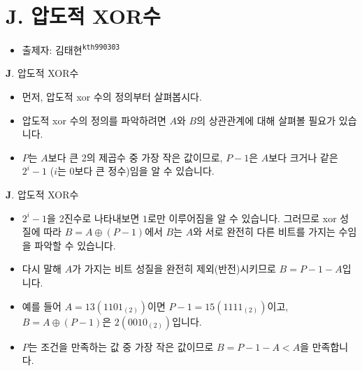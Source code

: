 \section{J. 압도적 XOR수}

\begin{frame} %
    \begin{itemize}
        \item 출제자: 김태현\textsuperscript{\color{kupc-gray}\texttt{kth990303}}
    \end{itemize}
\end{frame}

\begin{frame}{\textbf{J}. 압도적 XOR수}
    \begin{itemize}
        \item 먼저, 압도적 xor 수의 정의부터 살펴봅시다.
        \item 압도적 xor 수의 정의를 파악하려면 $A$와 $B$의 상관관계에 대해 살펴볼 필요가 있습니다.
        \item $P$는 $A$보다 큰 2의 제곱수 중 가장 작은 값이므로, $P-1$은 $A$보다 크거나 같은 $2^i-1$ ($i$는 0보다 큰 정수)임을 알 수 있습니다.
    \end{itemize}
\end{frame}

\begin{frame}{\textbf{J}. 압도적 XOR수}
	\begin{itemize}
		\item $2^i-1$을 2진수로 나타내보면 $1$로만 이루어짐을 알 수 있습니다. 그러므로 xor 성질에 따라 $B = A \oplus (P-1)$에서 $B$는 $A$와 서로 완전히 다른 비트를 가지는 수임을 파악할 수 있습니다. 
		\item 다시 말해 $A$가 가지는 비트 성질을 완전히 제외(반전)시키므로 $B = P - 1 - A$입니다.
		\item 예를 들어 $A = 13 (1101_{(2)})$이면 $P-1 = 15 (1111_{(2)})$이고, $B = A \oplus (P-1)$은 $2 (0010_{(2)})$입니다. 
		\item $P$는 조건을 만족하는 값 중 가장 작은 값이므로 $B = P - 1 - A < A$을 만족합니다.
	\end{itemize}
\end{frame}


